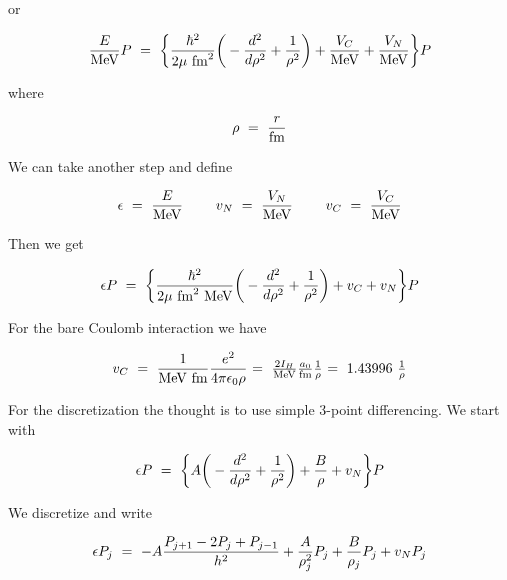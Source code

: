 \noindent
or

\begin{equation}
{E \over {\rm MeV}} P
~=~
\bigg \lbrace
{\hbar^2 \over 2 \mu~{\rm fm}^2} \bigg ( -{d^2 \over d \rho^2} + {1 \over \rho^2} \bigg )
+ {V_C \over {\rm MeV}}
+ {V_N \over {\rm MeV}}
\bigg \rbrace
P
\end{equation}

\noindent
where

\begin{equation}
\rho ~=~ {r \over {\rm fm}}
\end{equation}

\noindent
We can take another step and define

\begin{equation}
\epsilon ~=~ {E \over {\rm MeV}}
\ \ \ \ \ \ \
v_N ~=~ {V_N \over {\rm MeV}}
\ \ \ \ \ \ \
v_C ~=~ {V_C \over {\rm MeV}}
\end{equation}

\noindent
Then we get

\begin{equation}
\epsilon P
~=~
\bigg \lbrace
{\hbar^2 \over 2 \mu~{\rm fm}^2 ~{\rm MeV}} 
\bigg ( -{d^2 \over d \rho^2} + {1 \over \rho^2} \bigg )
+ v_C 
+ v_N 
\bigg \rbrace
P
\end{equation}

\noindent

For the bare Coulomb interaction we have

\begin{equation}
v_C
~=~ 
{1 \over {\rm MeV}~{\rm fm}} {e^2 \over 4 \pi \epsilon_0 \rho }
$$
$$
~=~
{2 I_H \over {\rm MeV}} {a_0 \over {\rm fm}} {1 \over \rho}
$$
$$
~=~
1.43996~ {1 \over \rho}
\end{equation}

For the discretization the thought is to use simple 3-point differencing.  We start with

\begin{equation}
\epsilon P
~=~
\bigg \lbrace
A \bigg ( -{d^2 \over d \rho^2} + {1 \over \rho^2} \bigg )
+ 
{B \over \rho} 
+ v_N 
\bigg \rbrace
P
\end{equation}

\noindent
We discretize and write

\begin{equation}
\epsilon P_j
~=~
- A {P_{j+1} - 2 P_j + P_{j-1} \over h^2}
+
{A \over \rho_j^2} P_j
+ 
{B \over \rho_j} P_j 
+ 
v_N P_j
\end{equation}

